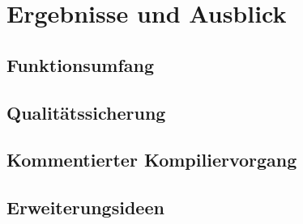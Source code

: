 \chapter{Ergebnisse und Ausblick}
\label{ch:ergebnisse_und_ausblick}

\section{Funktionsumfang}
\section{Qualitätssicherung}
\label{sec:qualitätssicherung}
\section{Kommentierter Kompiliervorgang}
\section{Erweiterungsideen}
